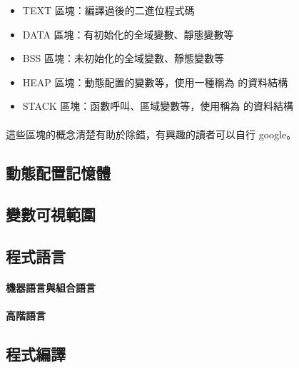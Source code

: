 \documentclass[12pt,a4paper,oneside]{report}
\begin{document}
\begin{CJK}{UTF8}{bkai}
\begin{itemize}
\item TEXT 區塊：編譯過後的二進位程式碼
\item DATA 區塊：有初始化的全域變數、靜態變數等
\item BSS 區塊：未初始化的全域變數、靜態變數等
\item HEAP 區塊：動態配置的變數等，使用一種稱為 的資料結構
\item STACK 區塊：函數呼叫、區域變數等，使用稱為 的資料結構
\end{itemize}

\paragraph{}這些區塊的概念清楚有助於除錯，有興趣的讀者可以自行 google。

\subsection{動態配置記憶體}

\subsection{變數可視範圍}

\subsection{程式語言}

\paragraph{機器語言與組合語言}
\paragraph{高階語言}

\subsection{程式編譯}

\ifx \allfiles \undefined

\printindex

\clearpage
\end{CJK}
\end{document}

